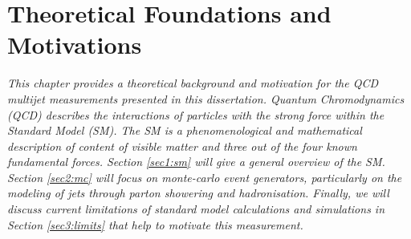 \chapter{Theoretical Foundations and Motivations}\label{chap:theory}
\textit{This chapter provides a theoretical background and motivation for the QCD multijet measurements presented in this dissertation. Quantum Chromodynamics (QCD) describes the interactions of particles with the strong force within the Standard Model (SM). The SM is a phenomenological and mathematical description of content of visible matter and three out of the four known fundamental forces. Section \ref{sec1:sm} will give a general overview of the SM. Section \ref{sec2:mc} will focus on monte-carlo event generators, particularly on the modeling of jets through parton showering and hadronisation. Finally, we will discuss current limitations of standard model calculations and simulations in Section \ref{sec3:limits} that help to motivate this measurement.}

